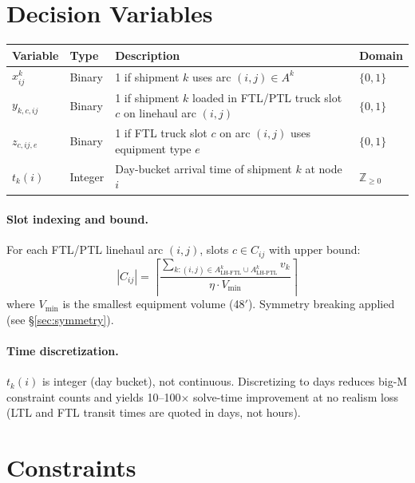 \documentclass[11pt,a4paper]{article}
\newcommand{\ceil}[1]{\left\lceil #1 \right\rceil}
\theoremstyle{definition}
\begin{document}
\section{Decision Variables}

\begin{center}
\begin{tabular}{llp{7cm}l}
\toprule
Variable & Type & Description & Domain \\
\midrule
$x_{ij}^k$ & Binary & 1 if shipment $k$ uses arc $(i,j) \in A^k$ & $\{0,1\}$ \\
$y_{k,c,ij}$ & Binary & 1 if shipment $k$ loaded in FTL/PTL truck slot $c$ on linehaul arc $(i,j)$ & $\{0,1\}$ \\
$z_{c,ij,e}$ & Binary & 1 if FTL truck slot $c$ on arc $(i,j)$ uses equipment type $e$ & $\{0,1\}$ \\
$t_k(i)$ & Integer & Day-bucket arrival time of shipment $k$ at node $i$ & $\mathbb{Z}_{\geq 0}$ \\
\bottomrule
\end{tabular}
\end{center}

\paragraph{Slot indexing and bound.}
For each FTL/PTL linehaul arc $(i,j)$, slots $c \in C_{ij}$ with upper bound:
\[
  |C_{ij}| = \ceil{\frac{\sum_{k : (i,j) \in A^k_{\text{LH-FTL}} \cup A^k_{\text{LH-PTL}}} v_k}{\eta \cdot V_{\min}}}
\]
where $V_{\min}$ is the smallest equipment volume (48$'$). Symmetry breaking applied (see \S\ref{sec:symmetry}).

\paragraph{Time discretization.}
$t_k(i)$ is integer (day bucket), not continuous. Discretizing to days reduces big-M
constraint counts and yields 10--100$\times$ solve-time improvement at no realism loss
(LTL and FTL transit times are quoted in days, not hours).

\section{Constraints}
\end{document}
